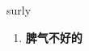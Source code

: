 
\begin{frame}
{\huge surly}
\begin{center}
\begin{enumerate}\Large
  \item \textbf{脾气不好的}
\end{enumerate}
\end{center}
\end{frame}
